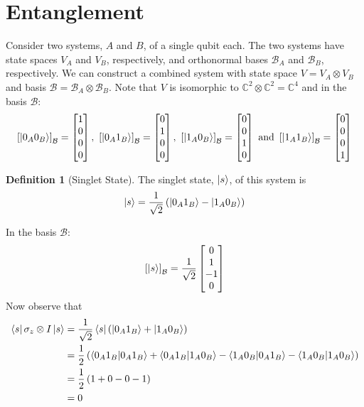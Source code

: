 \documentclass[11pt]{article}
\theoremstyle{definition}
\newtheorem{definition}{Definition}[section]
\begin{document}
\section{Entanglement}
Consider two systems, $A$ and $B$, of a single qubit each. The two systems have state spaces $V_A$ and $V_B$, respectively, and orthonormal bases $\mathcal{B}_A$ and $\mathcal{B}_B$, respectively. We can construct a combined system with state space $V = V_A \otimes V_B$ and basis $\mathcal{B} = \mathcal{B}_A \otimes \mathcal{B}_B$. Note that $V$ is isomorphic to $\mathbb{C}^2 \otimes \mathbb{C}^2 = \mathbb{C}^4$ and in the basis $\mathcal{B}$:
$$
\left[ \ket{0_A0_B} \right]_{\mathcal{B}} = \begin{bmatrix}
1 \\ 0 \\ 0 \\ 0
\end{bmatrix}
,\
\left[ \ket{0_A1_B} \right]_{\mathcal{B}} = \begin{bmatrix}
0 \\ 1 \\ 0 \\ 0
\end{bmatrix}
,\
\left[ \ket{1_A0_B} \right]_{\mathcal{B}} = \begin{bmatrix}
0 \\ 0 \\ 1 \\ 0
\end{bmatrix}
\ \mathrm{and} \ 
\left[ \ket{1_A1_B} \right]_{\mathcal{B}} = \begin{bmatrix}
0 \\ 0 \\ 0 \\ 1
\end{bmatrix}
$$
\begin{definition}[Singlet State]
The singlet state, $\ket{s}$, of this system is
$$\ket{s} = \frac{1}{\sqrt{2}} \left( \ket{0_A1_B} - \ket{1_A0_B} \right)$$
\end{definition}
In the basis $\mathcal{B}$:
$$
\left[ \ket{s} \right]_{\mathcal{B}}
= \frac{1}{\sqrt{2}} \begin{bmatrix}
0 \\ 1 \\ -1 \\ 0
\end{bmatrix}
$$
Now observe that
\begin{equation}
\begin{split}
\bra{s} \sigma_z \otimes I \ket{s}
& = \frac{1}{\sqrt{2}} \bra{s} \left( \ket{0_A1_B} + \ket{1_A0_B} \right) \\
& = \frac{1}{2} \left( \braket{0_A1_B}{0_A1_B} + \braket{0_A1_B}{1_A0_B} - \braket{1_A0_B}{0_A1_B} - \braket{1_A0_B}{1_A0_B} \right) \\
& = \frac{1}{2} \left( 1 + 0 - 0 - 1 \right) \\
& = 0
\end{split}
\end{equation}
\end{document}
